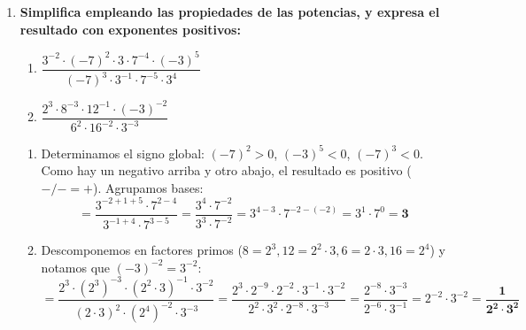 \documentclass[a4paper,12pt]{article}
\begin{document}
\begin{enumerate}
    \item \textbf{Simplifica empleando las propiedades de las potencias, y expresa el resultado con exponentes positivos:}
        \begin{enumerate}[label=\alph*)]
            \item $\dfrac{3^{-2} \cdot (-7)^{2} \cdot 3 \cdot 7^{-4} \cdot (-3)^{5}}{(-7)^{3} \cdot 3^{-1} \cdot 7^{-5} \cdot 3^{4}}$
            \item $\dfrac{2^{3} \cdot 8^{-3} \cdot 12^{-1} \cdot (-3)^{-2}}{6^{2} \cdot 16^{-2} \cdot 3^{-3}}$
        \end{enumerate}
        \begin{solucion}
            \begin{enumerate}[label=\alph*)]
                \item Determinamos el signo global: $(-7)^2 > 0$, $(-3)^5 < 0$, $(-7)^3 < 0$. Como hay un negativo arriba y otro abajo, el resultado es positivo ($-/- = +$). Agrupamos bases:
                $$= \dfrac{3^{-2+1+5} \cdot 7^{2-4}}{3^{-1+4} \cdot 7^{3-5}} = \dfrac{3^{4} \cdot 7^{-2}}{3^{3} \cdot 7^{-2}} = 3^{4-3} \cdot 7^{-2-(-2)} = 3^{1} \cdot 7^{0} = \mathbf{3}$$
                \item Descomponemos en factores primos ($8=2^3, 12=2^2\cdot 3, 6=2\cdot 3, 16=2^4$) y notamos que $(-3)^{-2} = 3^{-2}$:
                $$= \dfrac{2^{3} \cdot (2^{3})^{-3} \cdot (2^{2} \cdot 3)^{-1} \cdot 3^{-2}}{(2 \cdot 3)^{2} \cdot (2^{4})^{-2} \cdot 3^{-3}} = \dfrac{2^{3} \cdot 2^{-9} \cdot 2^{-2} \cdot 3^{-1} \cdot 3^{-2}}{2^{2} \cdot 3^{2} \cdot 2^{-8} \cdot 3^{-3}} = \dfrac{2^{-8} \cdot 3^{-3}}{2^{-6} \cdot 3^{-1}} = 2^{-2} \cdot 3^{-2} = \mathbf{\dfrac{1}{2^{2} \cdot 3^{2}}}$$
            \end{enumerate}
        \end{solucion}


\end{enumerate}
\end{document}
